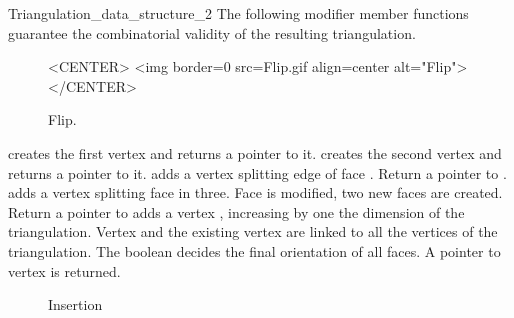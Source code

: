 \begin{ccRefConcept}{Triangulation_data_structure_2}
The following modifier member functions  guarantee
the combinatorial validity of the resulting triangulation.



\begin{figure}
\begin{ccTexOnly}
\begin{center} %

\end{center}
\end{ccTexOnly} 
\caption{Flip.
\label{I1_fig_flip}}

\begin{ccHtmlOnly}
<CENTER>
<img border=0 src=Flip.gif align=center alt="Flip">
</CENTER>
\end{ccHtmlOnly} 
\end{figure}


 {creates the first 
vertex and returns a pointer to it.}
\ccGlue
{} {creates the second 
vertex and returns a pointer to it.}
 {adds a
vertex  splitting 
edge  of face . Return a  pointer to .}
\ccGlue
{} {adds a vertex
 splitting  face
 in three. Face  is modified,
two new faces are created. Return a  pointer to  }
\ccGlue
{} {adds
a vertex , increasing by one the dimension of the triangulation.
Vertex  and the existing vertex  are linked to all 
the vertices of the triangulation. 
The boolean  decides the final orientation of all 
faces. A pointer to vertex  is returned.
}

\begin{figure}
\begin{ccTexOnly}
\begin{center}  \end{center}
\caption{Insertion}
\end{ccTexOnly} 


\end{figure}
\end{ccRefConcept}
